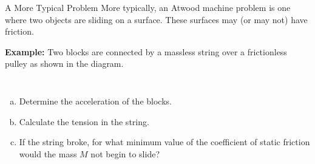 \documentclass[12pt,compress,aspectratio=169]{beamer}
\begin{document}
\begin{frame}{A More Typical Problem}
  More typically, an Atwood machine problem is one where two objects are
  sliding on a surface. These surfaces may (or may not) have friction.

  \vspace{.1in}\textbf{Example:} Two blocks are connected by a massless string
  over a frictionless pulley as shown in the diagram.
  \begin{columns}

    \begin{enumerate}[(a)]
    \item Determine the acceleration of the blocks.
    \item Calculate the tension in the string.
    \item If the string broke, for what minimum value of the coefficient of
      static friction would the mass $M$ not begin to slide?
    \end{enumerate}
  \end{columns}
\end{frame}
\end{document}
